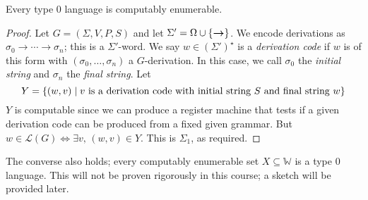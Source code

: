 \begin{theorem}
	Every type 0 language is computably enumerable.
\end{theorem}
\begin{proof}
	Let \( G = (\Sigma, V, P, S) \) and let \( \Sigma' = \Omega \cup \qty{\bm\to} \).
	We encode derivations as \( \sigma_0 \bm\to \cdots \bm\to \sigma_n \); this is a \( \Sigma' \)-word.
	We say \( w \in (\Sigma')^\star \) is a \emph{derivation code} if \( w \) is of this form with \( (\sigma_0, \dots, \sigma_n) \) a \( G \)-derivation.
	In this case, we call \( \sigma_0 \) the \emph{initial string} and \( \sigma_n \) the \emph{final string}.
	Let
	\[ Y = \qty{(w, v) \mid v \text{ is a derivation code with initial string } S \text{ and final string } w} \]
	\( Y \) is computable since we can produce a register machine that tests if a given derivation code can be produced from a fixed given grammar.
	But \( w \in \mathcal L(G) \iff \exists v,\, (w, v) \in Y \).
	This is \( \Sigma_1 \), as required.
\end{proof}
\begin{remark}
	The converse also holds; every computably enumerable set \( X \subseteq \mathbb W \) is a type 0 language.
	This will not be proven rigorously in this course; a sketch will be provided later.
\end{remark}

